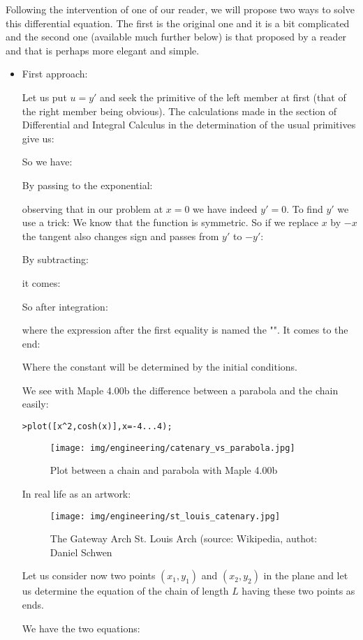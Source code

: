 	Following the intervention of one of our reader, we will propose two ways to solve this differential equation. The first is the original one and it is a bit complicated and the second one (available much further below) is that proposed by a reader and that  is perhaps more elegant and simple.
	\begin{itemize}
		\item First approach:

		Let us put $u=y'$ and seek the primitive of the left member at first (that of the right member being obvious). The calculations made in the section of Differential and Integral Calculus in the determination of the usual primitives give us:
		
		So we have:
		
		By passing to the exponential:
		
		observing that in our problem at $x=0$ we have indeed $y'=0$.
		To find $y'$ we use a trick: We know that the function is symmetric. So if we replace $x$ by $-x$ the tangent also changes sign and passes from $y'$ to $-y'$:
		
		By subtracting:
		
		it comes:
		
		So after integration:
		
		where the expression after the first equality is named the "". It comes to the end:
		
		Where the constant will be determined by the initial conditions.
	
		We see with Maple 4.00b the difference between a parabola and the chain easily:
	
		\texttt{>plot([x\string^2,cosh(x)],x=-4...4);}
		\begin{figure}[H]
			\centering
			\texttt{[image: img/engineering/catenary\_vs\_parabola.jpg]}
			\caption{Plot between a chain and parabola with Maple 4.00b}
		\end{figure}
		In real life as an artwork:
		\begin{figure}[H]
			\centering
			\texttt{[image: img/engineering/st\_louis\_catenary.jpg]}
			\caption{The Gateway Arch St. Louis Arch (source: Wikipedia, authot: Daniel Schwen}
		\end{figure}
		Let us consider now two points $(x_1,y_1)$ and $(x_2,y_2)$ in the plane and let us determine the equation of the chain of length $L$ having these two points as ends.

		We have the two equations:
		

\end{itemize}
